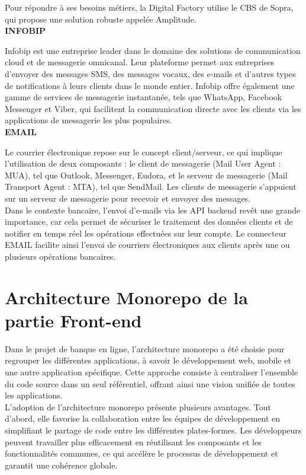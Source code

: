 Pour répondre à ses besoins métiers, la Digital Factory utilise le CBS de Sopra, qui propose une solution robuste appelée Amplitude.\\

\textbf{\large{INFOBIP}\\}

Infobip est une entreprise leader dans le domaine des solutions de communication cloud et de messagerie omnicanal. Leur plateforme permet aux entreprises d'envoyer des messages SMS, des messages vocaux, des e-mails et d'autres types de notifications à leurs clients dans le monde entier. Infobip offre également une gamme de services de messagerie instantanée, tels que WhatsApp, Facebook Messenger et Viber, qui facilitent la communication directe avec les clients via les applications de messagerie les plus populaires.\\

\textbf{\large{EMAIL}\\}

Le courrier électronique repose sur le concept client/serveur, ce qui implique l'utilisation de deux composants : le client de messagerie (Mail User Agent : MUA), tel que Outlook, Messenger, Eudora, et le serveur de messagerie (Mail Transport Agent : MTA), tel que SendMail. Les clients de messagerie s'appuient sur un serveur de messagerie pour recevoir et envoyer des messages.\\

Dans le contexte bancaire, l'envoi d'e-mails via les API backend revêt une grande importance, car cela permet de sécuriser le traitement des données clients et de notifier en temps réel les opérations effectuées sur leur compte. Le connecteur EMAIL facilite ainsi l'envoi de courriers électroniques aux clients après une ou plusieurs opérations bancaires.

\section{Architecture Monorepo de la partie Front-end}
Dans le projet de banque en ligne, l'architecture monorepo a été choisie pour regrouper les différentes applications, à savoir le développement web, mobile et une autre application spécifique. Cette approche consiste à centraliser l'ensemble du code source dans un seul référentiel, offrant ainsi une vision unifiée de toutes les applications.\\

L'adoption de l'architecture monorepo présente plusieurs avantages. Tout d'abord, elle favorise la collaboration entre les équipes de développement en simplifiant le partage de code entre les différentes plates-formes. Les développeurs peuvent travailler plus efficacement en réutilisant les composants et les fonctionnalités communes, ce qui accélère le processus de développement et garantit une cohérence globale.\\

